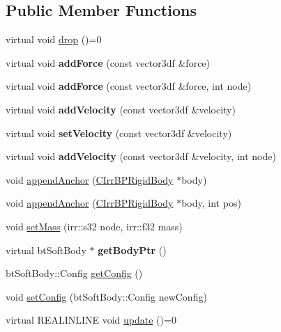 \subsection*{Public Member Functions}
\begin{DoxyCompactItemize}
\item 
virtual void \hyperlink{class_c_irr_b_p_soft_body_a6a0dabc093e869d674ae14d35084e366}{drop} ()=0
\item 
\hypertarget{class_c_irr_b_p_soft_body_ad12bae7d279b63fe1e9e332281ab79f2}{
virtual void {\bfseries addForce} (const vector3df \&force)}
\label{class_c_irr_b_p_soft_body_ad12bae7d279b63fe1e9e332281ab79f2}

\item 
\hypertarget{class_c_irr_b_p_soft_body_a68026ecad3ffce887ca6b1d3f95b33c1}{
virtual void {\bfseries addForce} (const vector3df \&force, int node)}
\label{class_c_irr_b_p_soft_body_a68026ecad3ffce887ca6b1d3f95b33c1}

\item 
\hypertarget{class_c_irr_b_p_soft_body_a827d8a2e7890a2a651d201a8f214ced3}{
virtual void {\bfseries addVelocity} (const vector3df \&velocity)}
\label{class_c_irr_b_p_soft_body_a827d8a2e7890a2a651d201a8f214ced3}

\item 
\hypertarget{class_c_irr_b_p_soft_body_a7fc7b890b79cb265ab4c45769146ab22}{
virtual void {\bfseries setVelocity} (const vector3df \&velocity)}
\label{class_c_irr_b_p_soft_body_a7fc7b890b79cb265ab4c45769146ab22}

\item 
\hypertarget{class_c_irr_b_p_soft_body_aa8d216f67d103bf3fbf9d66b2f566795}{
virtual void {\bfseries addVelocity} (const vector3df \&velocity, int node)}
\label{class_c_irr_b_p_soft_body_aa8d216f67d103bf3fbf9d66b2f566795}

\item 
void \hyperlink{class_c_irr_b_p_soft_body_a088854e004b50e08e4694e24a29a597f}{appendAnchor} (\hyperlink{class_c_irr_b_p_rigid_body}{CIrrBPRigidBody} $\ast$body)
\item 
void \hyperlink{class_c_irr_b_p_soft_body_a53bdc4e61a37a3f352a9733791e5953f}{appendAnchor} (\hyperlink{class_c_irr_b_p_rigid_body}{CIrrBPRigidBody} $\ast$body, int pos)
\item 
void \hyperlink{class_c_irr_b_p_soft_body_a426a1c9bb3d5c0d4c6f2852b5b93729c}{setMass} (irr::s32 node, irr::f32 mass)
\item 
\hypertarget{class_c_irr_b_p_soft_body_a656ebb1c277691729e5c87f33ec89b14}{
virtual btSoftBody $\ast$ {\bfseries getBodyPtr} ()}
\label{class_c_irr_b_p_soft_body_a656ebb1c277691729e5c87f33ec89b14}

\item 
btSoftBody::Config \hyperlink{class_c_irr_b_p_soft_body_af8c53ac0291f89c021809e7212d43a38}{getConfig} ()
\item 
void \hyperlink{class_c_irr_b_p_soft_body_a1e76924b9dd02161e1bc6ec46f0968a1}{setConfig} (btSoftBody::Config newConfig)
\item 
virtual REALINLINE void \hyperlink{class_c_irr_b_p_soft_body_ad181a9deb172592d195692595bee2cd1}{update} ()=0
\end{DoxyCompactItemize}
